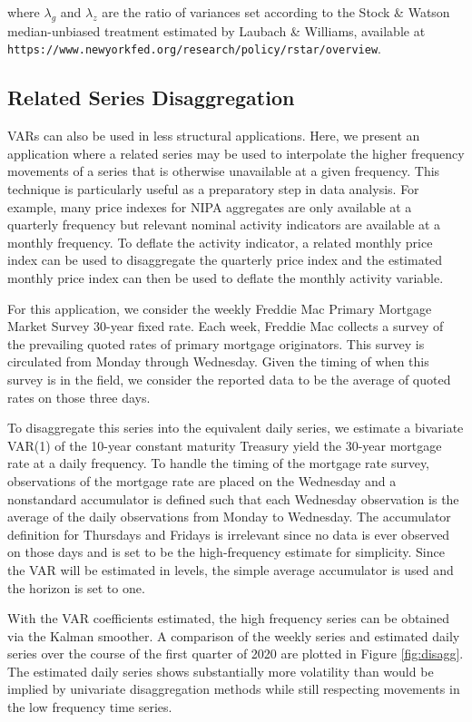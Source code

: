 \documentclass{article}
\begin{document}
where $\lambda_g$ and $\lambda_z$ are the ratio of variances set according to the Stock \& Watson median-unbiased treatment estimated by Laubach \& Williams, available at \texttt{https://www.newyorkfed.org/research/policy/rstar/overview}. 

 
\subsection{Related Series Disaggregation}\label{sec:RSDisagg}

VARs can also be used in less structural applications. Here, we present an application where a related series may be used to interpolate the higher frequency movements of a series that is otherwise unavailable at a given frequency. This technique is particularly useful as a preparatory step in data analysis. For example, many price indexes for NIPA aggregates are only available at a quarterly frequency but relevant nominal activity indicators are available at a monthly frequency. To deflate the activity indicator, a related monthly price index can be used to disaggregate the quarterly price index and the estimated monthly price index can then be used to deflate the monthly activity variable. 

For this application, we consider the weekly Freddie Mac Primary Mortgage Market Survey 30-year fixed rate. Each week, Freddie Mac collects a survey of the prevailing quoted rates of primary mortgage originators. This survey is circulated from Monday through Wednesday. Given the timing of when this survey is in the field, we consider the reported data to be the average of quoted rates on those three days. 

To disaggregate this series into the equivalent daily series, we estimate a bivariate VAR(1) of the 10-year constant maturity Treasury yield the 30-year mortgage rate at a daily frequency. To handle the timing of the mortgage rate survey, observations of the mortgage rate are placed on the Wednesday and a nonstandard accumulator is defined such that each Wednesday observation is the average of the daily observations from Monday to Wednesday. The accumulator definition for Thursdays and Fridays is irrelevant since no data is ever observed on those days and is set to be the high-frequency estimate for simplicity. Since the VAR will be estimated in levels, the simple average accumulator is used and the horizon is set to one. 


With the VAR coefficients estimated, the high frequency series can be obtained via the Kalman smoother. A comparison of the weekly series and estimated daily series over the course of the first quarter of 2020 are plotted in Figure \ref{fig:disagg}. The estimated daily series shows substantially more volatility than would be implied by univariate disaggregation methods while still respecting movements in the low frequency time series. 
\end{document}
